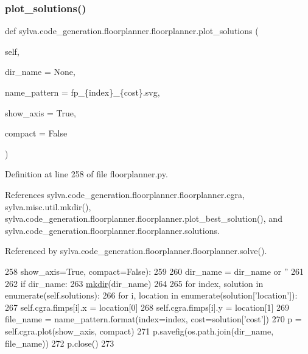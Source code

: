 \subsubsection{\texorpdfstring{plot\+\_\+solutions()}{plot\_solutions()}}
{\footnotesize\ttfamily def sylva.\+code\+\_\+generation.\+floorplanner.\+floorplanner.\+plot\+\_\+solutions (\begin{DoxyParamCaption}\item[{}]{self,  }\item[{}]{dir\+\_\+name = {\ttfamily None},  }\item[{}]{name\+\_\+pattern = {\ttfamily \textquotesingle{}fp\+\_\+\{index\}\+\_\+\{cost\}.svg\textquotesingle{}},  }\item[{}]{show\+\_\+axis = {\ttfamily True},  }\item[{}]{compact = {\ttfamily False} }\end{DoxyParamCaption})}



Definition at line 258 of file floorplanner.\+py.



References sylva.\+code\+\_\+generation.\+floorplanner.\+floorplanner.\+cgra, sylva.\+misc.\+util.\+mkdir(), sylva.\+code\+\_\+generation.\+floorplanner.\+floorplanner.\+plot\+\_\+best\+\_\+solution(), and sylva.\+code\+\_\+generation.\+floorplanner.\+floorplanner.\+solutions.



Referenced by sylva.\+code\+\_\+generation.\+floorplanner.\+floorplanner.\+solve().


\begin{DoxyCode}
258                        show\_axis=\textcolor{keyword}{True}, compact=\textcolor{keyword}{False}):
259 
260         dir\_name = dir\_name \textcolor{keywordflow}{or} \textcolor{stringliteral}{''}
261 
262         \textcolor{keywordflow}{if} dir\_name:
263             \hyperlink{namespacesylva_1_1misc_1_1util_af426e429c40209bbb46e3a0e8f139a44}{mkdir}(dir\_name)
264 
265         \textcolor{keywordflow}{for} index, solution \textcolor{keywordflow}{in} enumerate(self.solutions):
266             \textcolor{keywordflow}{for} i, location \textcolor{keywordflow}{in} enumerate(solution[\textcolor{stringliteral}{'location'}]):
267                 self.cgra.fimps[i].x = location[0]
268                 self.cgra.fimps[i].y = location[1]
269             file\_name = name\_pattern.format(index=index, cost=solution[\textcolor{stringliteral}{'cost'}])
270             p = self.cgra.plot(show\_axis, compact)
271             p.savefig(os.path.join(dir\_name, file\_name))
272             p.close()
273 
\end{DoxyCode}
\mbox{\label{classsylva_1_1code__generation_1_1floorplanner_1_1floorplanner_ab5bba2d11374f0e3fe5199738e01033a}} 
